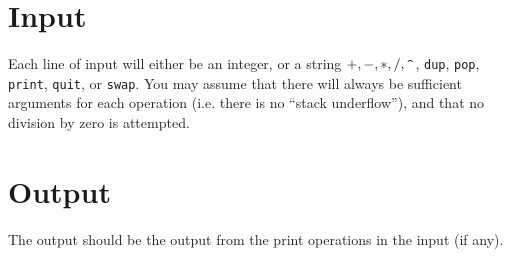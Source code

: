 \section*{Input}

Each line of input will either be an integer, or a string
$+, -, *, /, \verb|^|$, \texttt{dup}, \texttt{pop}, \texttt{print},
\texttt{quit}, or \texttt{swap}.
You may assume that there will always be sufficient arguments for each
operation (i.e. there is no ``stack underflow''), and that no division
by zero is attempted.

\section*{Output}
The output should be the output from the print operations in the input (if any).

